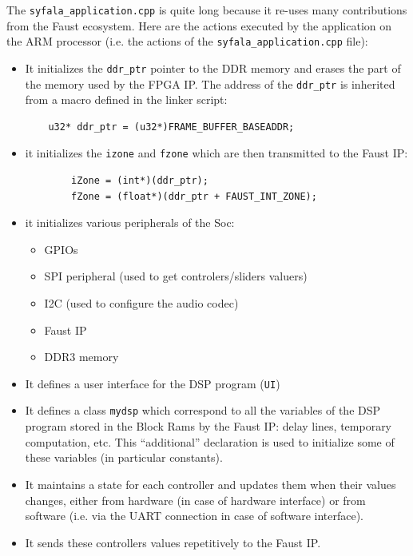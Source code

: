 \documentclass[11pt]{article}
\numberwithin{equation}{section}
\numberwithin{figure}{section}
\begin{document}
The   {\tt syfala\_application.cpp} is quite long because it re-uses many contributions from the Faust ecosystem. Here are the actions executed by the application on the ARM processor (i.e. the actions of the {\tt syfala\_application.cpp} file):
  \begin{itemize}
  \item It initializes the {\tt ddr\_ptr} pointer to the DDR memory and erases the part of the memory used by the FPGA IP. The address of the {\tt ddr\_ptr} is  inherited from a macro defined in the linker script: 
\begin{verbatim}
    u32* ddr_ptr = (u32*)FRAME_BUFFER_BASEADDR;
\end{verbatim}

\item it initializes the {\tt izone} and {\tt fzone} which are then transmitted to the Faust IP:
\begin{verbatim}
        iZone = (int*)(ddr_ptr);
        fZone = (float*)(ddr_ptr + FAUST_INT_ZONE);
\end{verbatim}
\item it initializes various peripherals of the Soc:
  \begin{itemize}
  \item GPIOs
  \item SPI peripheral (used to get controlers/sliders valuers)
  \item I2C (used to configure the audio codec)
  \item Faust IP
  \item DDR3 memory
  \end{itemize}
\item It defines a user interface for the DSP program ({\tt UI})
\item It defines a class {\tt mydsp} which correspond to all the variables of the DSP program  stored in the Block Rams by the Faust IP: delay lines, temporary computation, etc. This ``additional'' declaration is used to initialize some of these variables (in particular constants).
  \item It maintains a state for each controller and updates them when their values changes, either from hardware (in case of hardware interface) or from software (i.e. via the UART connection in case of software interface).
  \item It sends these controllers values repetitively to the Faust IP.
  \end{itemize}
\end{document}
